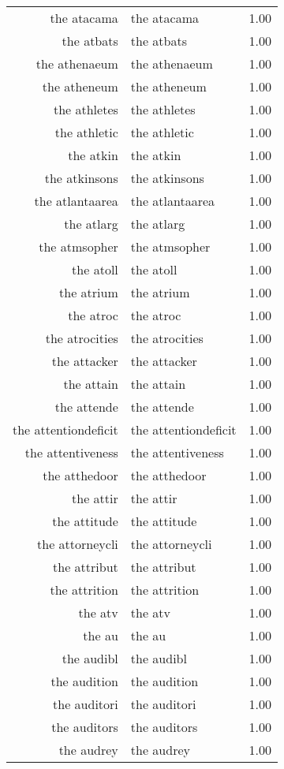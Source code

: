 \begin{table}[ht]
\begin{tabular}{rlr}
  the atacama & the atacama & 1.00 \\ 
  the atbats & the atbats & 1.00 \\ 
  the athenaeum & the athenaeum & 1.00 \\ 
  the atheneum & the atheneum & 1.00 \\ 
  the athletes & the athletes & 1.00 \\ 
  the athletic & the athletic & 1.00 \\ 
  the atkin & the atkin & 1.00 \\ 
  the atkinsons & the atkinsons & 1.00 \\ 
  the atlantaarea & the atlantaarea & 1.00 \\ 
  the atlarg & the atlarg & 1.00 \\ 
  the atmsopher & the atmsopher & 1.00 \\ 
  the atoll & the atoll & 1.00 \\ 
  the atrium & the atrium & 1.00 \\ 
  the atroc & the atroc & 1.00 \\ 
  the atrocities & the atrocities & 1.00 \\ 
  the attacker & the attacker & 1.00 \\ 
  the attain & the attain & 1.00 \\ 
  the attende & the attende & 1.00 \\ 
  the attentiondeficit & the attentiondeficit & 1.00 \\ 
  the attentiveness & the attentiveness & 1.00 \\ 
  the atthedoor & the atthedoor & 1.00 \\ 
  the attir & the attir & 1.00 \\ 
  the attitude & the attitude & 1.00 \\ 
  the attorneycli & the attorneycli & 1.00 \\ 
  the attribut & the attribut & 1.00 \\ 
  the attrition & the attrition & 1.00 \\ 
  the atv & the atv & 1.00 \\ 
  the au & the au & 1.00 \\ 
  the audibl & the audibl & 1.00 \\ 
  the audition & the audition & 1.00 \\ 
  the auditori & the auditori & 1.00 \\ 
  the auditors & the auditors & 1.00 \\ 
  the audrey & the audrey & 1.00 \\ 

\end{tabular}
\end{table}
